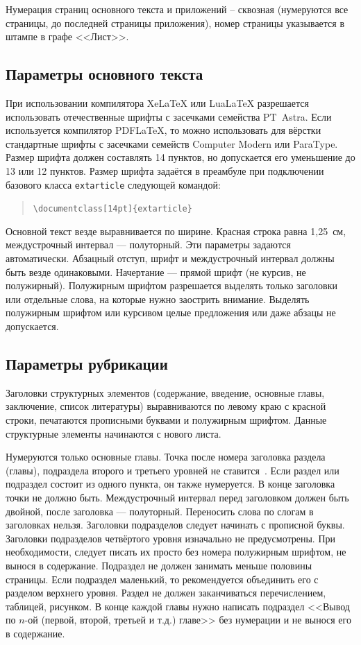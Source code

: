 \documentclass[14pt]{extarticle}
\begin{document}
Нумерация страниц основного текста и приложений – сквозная (нумеруются все страницы, до последней страницы приложения), номер страницы указывается в штампе в графе <<Лист>>.

\subsection{Параметры основного текста}
При использовании компилятора XeLaTeX или LuaLaTeX разрешается использовать отечественные шрифты с засечками семейства PT~Astra. Если используется компилятор PDFLaTeX, то можно использовать для вёрстки стандартные шрифты с засечками семейств Computer Modern или ParaType. Размер шрифта должен составлять 14 пунктов, но допускается его уменьшение до 13 или 12 пунктов. Размер шрифта задаётся в преамбуле при подключении базового класса \texttt{extarticle} следующей командой:
\begin{quote}
\small\verb|\documentclass[14pt]{extarticle}|
\end{quote}

Основной текст везде выравнивается по ширине. Красная строка равна 1,25~см, междустрочный интервал --- полуторный. Эти параметры задаются автоматически. Абзацный отступ, шрифт и междустрочный интервал должны быть везде одинаковыми. Начертание --- прямой шрифт (не курсив, не полужирный). Полужирным шрифтом разрешается выделять только заголовки или отдельные слова, на которые нужно заострить внимание. Выделять полужирным шрифтом или курсивом целые предложения или даже абзацы не допускается. 

\subsection{Параметры рубрикации}
Заголовки структурных элементов (содержание, введение, основные главы, заключение, список литературы) выравниваются по левому краю с красной строки, печатаются прописными буквами и полужирным шрифтом. Данные структурные элементы начинаются с нового листа.

Нумеруются только основные главы. Точка после номера заголовка раздела (главы), подраздела второго и третьего уровней не ставится~\cite[раздел 6.5]{gost2105}.
Если раздел или подраздел состоит из одного пункта, он также нумеруется.
В конце заголовка точки не должно быть. Междустрочный интервал перед заголовком должен быть двойной, после заголовка --- полуторный.
Переносить слова по слогам в заголовках нельзя.
Заголовки подразделов следует начинать с прописной буквы. Заголовки подразделов четвёртого уровня изначально не предусмотрены. При необходимости, следует писать их просто без номера полужирным шрифтом, не вынося в содержание. Подраздел не должен занимать меньше половины страницы. Если подраздел маленький, то рекомендуется объединить его с разделом верхнего уровня. Раздел не должен заканчиваться перечислением, таблицей, рисунком. В конце каждой главы нужно написать подраздел <<Вывод по $n$-ой (первой, второй, третьей и т.д.) главе>> без нумерации и не вынося его в содержание.
\end{document}
